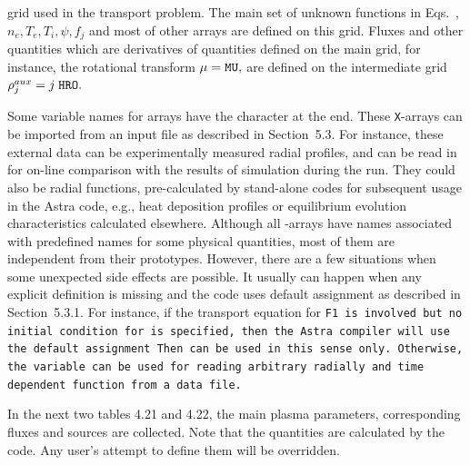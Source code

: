 grid used in the transport problem. 
The main set of unknown functions in Eqs.~, 
$n_e,T_e,T_i,\psi,f_j$ and most of other arrays are defined on this
grid.  
Fluxes and other quantities which are
derivatives of quantities defined on the main grid, for instance, the
rotational transform $\mu=\tt MU,$ are defined on the intermediate grid 
$\rho_j^{aux}=j\;{\tt HRO}.$

Some variable names for arrays have the character  at the end. 
These {\tt X}-arrays can be imported from an
input file as described in Section~5.3. 
For instance, these external data can be experimentally measured radial
profiles, and can be read in for on-line comparison with the results of
simulation during the run. 
They could also be radial functions, pre-calculated by stand-alone codes 
for subsequent usage in the Astra code, e.g., heat deposition profiles
or equilibrium evolution characteristics calculated elsewhere. 
Although all -arrays have names associated with predefined
names for some physical quantities, most of them are independent from
their prototypes.
However, there are a few situations when some unexpected side effects are
possible. 
It usually can happen when any explicit definition is missing and the
code uses default assignment as described in Section~5.3.1.
For instance, if the transport equation  for \tt F1 \rm is
involved but no initial condition for  is specified, then the
Astra compiler will use the default assignment 
Then  can be used in this sense only.
Otherwise, the variable  can be used for reading arbitrary
radially and time dependent function from a data file.

In the next two tables 4.21 and 4.22, the main plasma parameters,
corresponding fluxes and sources are collected. 
Note that the quantities  are
calculated by the code. 
Any user's attempt to define them will be overridden.

